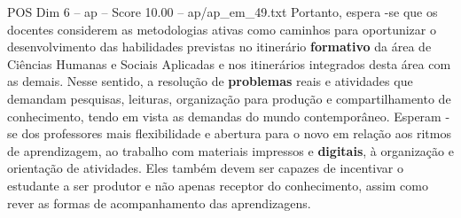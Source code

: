 \begin{textsample}{POS Dim 6 – ap – Score 10.00 – ap/ap\_em\_49.txt}
Portanto, espera -se que os docentes considerem as metodologias ativas como caminhos para oportunizar o desenvolvimento das habilidades previstas no itinerário \textbf{formativo} da área de Ciências Humanas e Sociais Aplicadas e nos itinerários integrados desta área com as demais.
Nesse sentido, a resolução de \textbf{problemas} reais e atividades que demandam pesquisas, leituras, organização para produção e compartilhamento de conhecimento, tendo em vista as demandas do mundo contemporâneo.
Esperam -se dos professores mais flexibilidade e abertura para o novo em relação aos ritmos de aprendizagem, ao trabalho com materiais impressos e \textbf{digitais}, à organização e orientação de atividades.
Eles também devem ser capazes de incentivar o estudante a ser produtor e não apenas receptor do conhecimento, assim como rever as formas de acompanhamento das aprendizagens.

\end{textsample}
